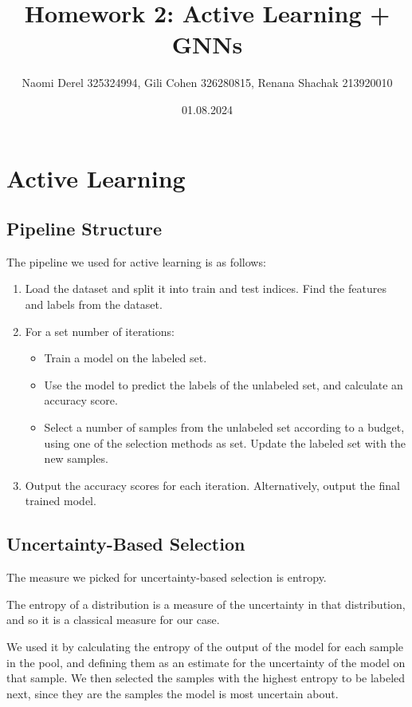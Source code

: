 \documentclass[12pt]{article}
\begin{document}
\title{Homework 2: Active Learning + GNNs}
\author{Naomi Derel 325324994, Gili Cohen 326280815, Renana Shachak 213920010}
\date{01.08.2024}
\maketitle

\section{Active Learning}

\subsection{Pipeline Structure}

The pipeline we used for active learning is as follows:
\begin{enumerate}
    \item Load the dataset and split it into train and test indices. Find the features and labels from the dataset.
    \item For a set number of iterations:
    \begin{itemize}
        \item Train a model on the labeled set.
        \item Use the model to predict the labels of the unlabeled set, and calculate an accuracy score.
        \item Select a number of samples from the unlabeled set according to a budget, using one of the selection methods as set. Update the labeled set with the new samples.
    \end{itemize}
    \item Output the accuracy scores for each iteration. Alternatively, output the final trained model.
\end{enumerate}

\subsection{Uncertainty-Based Selection}

The measure we picked for uncertainty-based selection is entropy. 

The entropy of a distribution is a measure of the uncertainty in that distribution, and so it is a classical measure for our case. 

We used it by calculating the entropy of the output of the model for each sample in the pool, and defining them as an estimate for the uncertainty of the model on that sample. We then selected the samples with the highest entropy to be labeled next, since they are the samples the model is most uncertain about.
\end{document}
